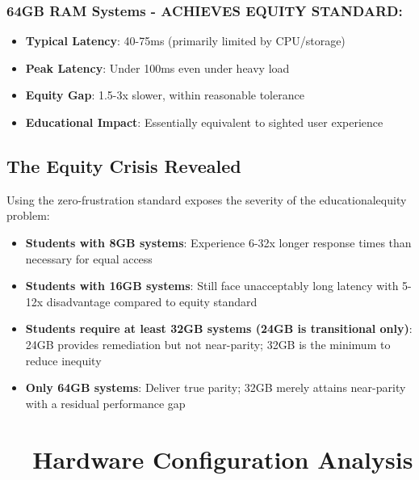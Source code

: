\subsubsection{64GB RAM Systems - ACHIEVES EQUITY STANDARD:}

\begin{itemize}
	\item \textbf{Typical Latency}: 40-75ms (primarily limited by CPU/storage)
	\item \textbf{Peak Latency}: Under 100ms even under heavy load
	\item \textbf{Equity Gap}: 1.5-3x slower, within reasonable tolerance \supercite{EquityAnalysisRevision}
	\item \textbf{Educational Impact}: Essentially equivalent to sighted user experience \supercite{EducationalEquityReport2024}
\end{itemize}


\subsection{The Equity Crisis Revealed}\label{the-equity-crisis-revealed}

Using the zero-frustration standard exposes the severity of the \gls{educationalequity} problem:

\begin{itemize}
	\item \textbf{Students with 8GB systems}: Experience 6-32x longer response times than necessary for equal access \supercite{EducationalEquityReport2024}
	\item \textbf{Students with 16GB systems}: Still face unacceptably long latency with 5-12x disadvantage compared to equity standard \supercite{EducationalEquityReport2024}
	\item \textbf{Students require at least 32GB systems (24GB is transitional only)}: 24GB provides remediation but not near-parity; 32GB is the minimum to reduce inequity \supercite{EducationalEquityReport2024}
	\item \textbf{Only 64GB systems}: Deliver true parity; 32GB merely attains near-parity with a residual performance gap \supercite{EducationalEquityReport2024}
\end{itemize}


\hypertarget{hardware\index{hardware}-configuration-analysis}{}\section{~~Hardware Configuration Analysis}\label{hardware-configuration-analysis}
